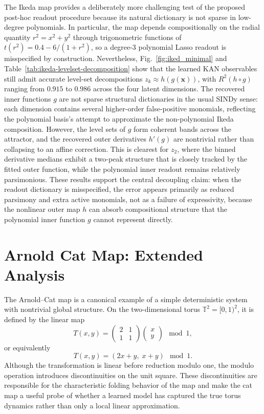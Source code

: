 \documentclass{article}
\begin{document}
The Ikeda map provides a deliberately more challenging test of the proposed post-hoc readout procedure because its natural dictionary is not sparse in low-degree polynomials.  In particular, the map depends compositionally on the radial quantity $r^2=x^2+y^2$ through trigonometric functions of $t(r^2)=0.4-6/(1+r^2)$, so a degree-3 polynomial Lasso readout is misspecified by construction.  Nevertheless, Fig.~\ref{fig:iked_minimal} and Table~\ref{tab:ikeda-levelset-decomposition} show that the learned KAN observables still admit accurate level-set decompositions $z_k \approx h(g(\mathbf{x}))$, with $R^2(h\circ g)$ ranging from $0.915$ to $0.986$ across the four latent dimensions.  The recovered inner functions $g$ are not sparse structural dictionaries in the usual SINDy sense: each dimension contains several higher-order false-positive monomials, reflecting the polynomial basis's attempt to approximate the non-polynomial Ikeda composition.  However, the level sets of $g$ form coherent bands across the attractor, and the recovered outer derivatives $h'(g)$ are nontrivial rather than collapsing to an affine correction.  This is clearest for $z_2$, where the binned derivative medians exhibit a two-peak structure that is closely tracked by the fitted outer function, while the polynomial inner readout remains relatively parsimonious.  These results support the central decoupling claim: when the readout dictionary is misspecified, the error appears primarily as reduced parsimony and extra active monomials, not as a failure of expressivity, because the nonlinear outer map $h$ can absorb compositional structure that the polynomial inner function $g$ cannot represent directly.

\clearpage
\section{Arnold Cat Map: Extended Analysis}
\label{app:cat_map}


The Arnold--Cat map is a canonical example of a simple deterministic system with nontrivial global structure. On the two-dimensional torus
$\mathbb{T}^2 = [0,1)^2$, it is defined by the linear map
$$
T(x,y) =
\begin{pmatrix}
2 & 1 \\
1 & 1
\end{pmatrix}
\begin{pmatrix}
x \\ y
\end{pmatrix}
\mod 1,
$$
or equivalently
$$
T(x,y) = (2x+y,\; x+y) \mod 1.
$$
Although the transformation is linear before reduction modulo one, the modulo operation introduces discontinuities on the unit square. These discontinuities are responsible for the characteristic folding behavior of the map and make the cat map a useful probe of whether a learned model has captured the true torus dynamics rather than only a local linear approximation.
\end{document}
